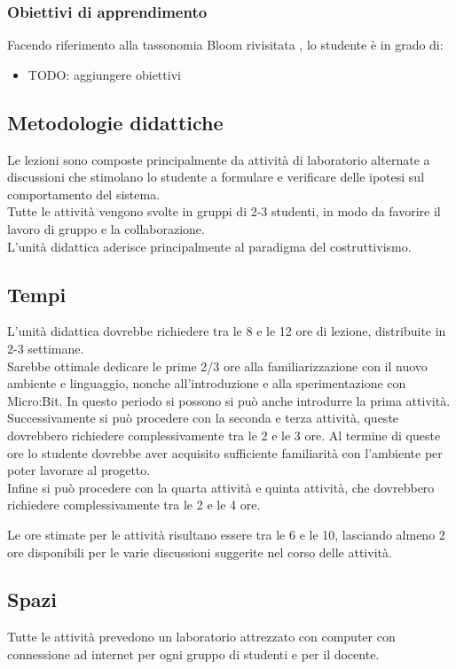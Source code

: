 \documentclass[../../relazione.tex]{subfiles}
\begin{document}
\subsubsection{Obiettivi di apprendimento}
Facendo riferimento alla tassonomia Bloom rivisitata \cite{BLOOM}, lo studente è in grado di:
\begin{itemize}
	\item TODO: aggiungere obiettivi
\end{itemize}

\subsection{Metodologie didattiche}

Le lezioni sono composte principalmente da attività di laboratorio alternate a discussioni che stimolano lo studente a formulare e verificare delle ipotesi sul comportamento del sistema.\\
Tutte le attività vengono svolte in gruppi di 2-3 studenti, in modo da favorire il lavoro di gruppo e la collaborazione.\\
L'unità didattica aderisce principalmente al paradigma del costruttivismo.

\subsection{Tempi}
L'unità didattica dovrebbe richiedere tra le 8 e le 12 ore di lezione, distribuite in 2-3 settimane.\\
Sarebbe ottimale dedicare le prime 2/3 ore alla familiarizzazione con il nuovo ambiente e linguaggio, nonche all'introduzione e alla sperimentazione con Micro:Bit. In questo periodo si possono si può anche introdurre la prima attività.\\
Successivamente si può procedere con la seconda e terza attività, queste dovrebbero richiedere complessivamente tra le 2 e le 3 ore. Al termine di queste ore lo studente dovrebbe aver acquisito sufficiente familiarità con l'ambiente per poter lavorare al progetto.\\
Infine si può procedere con la quarta attività e quinta attività, che dovrebbero richiedere complessivamente tra le 2 e le 4 ore. 

Le ore stimate per le attività risultano essere tra le 6 e le 10, lasciando almeno 2 ore disponibili per le varie discussioni suggerite nel corso delle attività.

\subsection{Spazi}
Tutte le attività prevedono un laboratorio attrezzato con computer con connessione ad internet per ogni gruppo di studenti e per il docente. 
\end{document}
